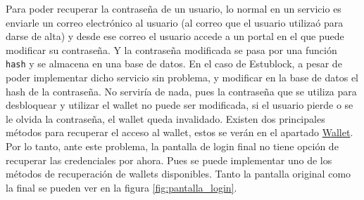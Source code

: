 Para poder recuperar la contraseña de un usuario, lo normal en un servicio es enviarle un correo electrónico al usuario (al correo que el usuario utilizaó para darse de alta) y desde ese correo el usuario accede a un portal en el que puede modificar su contraseña. Y la contraseña modificada se pasa por una función \verb|hash|\cite{whatIsHash} y se almacena en una base de datos. En el caso de Estublock, a pesar de poder implementar dicho servicio sin problema, y modificar en la base de datos el hash de la contraseña. No serviría de nada, pues la contraseña que se utiliza para desbloquear y utilizar el wallet no puede ser modificada, si el usuario pierde o se le olvida la contraseña, el wallet queda invalidado. Existen dos principales métodos para recuperar el acceso al wallet, estos se verán en el apartado \hyperref[sec:wallet]{Wallet}. Por lo tanto, ante este problema, la pantalla de login final no tiene opción de recuperar las credenciales por ahora. Pues se puede implementar uno de los métodos de recuperación de wallets disponibles. Tanto la pantalla original como la final se pueden ver en la figura \ref{fig:pantalla_login}. \\

